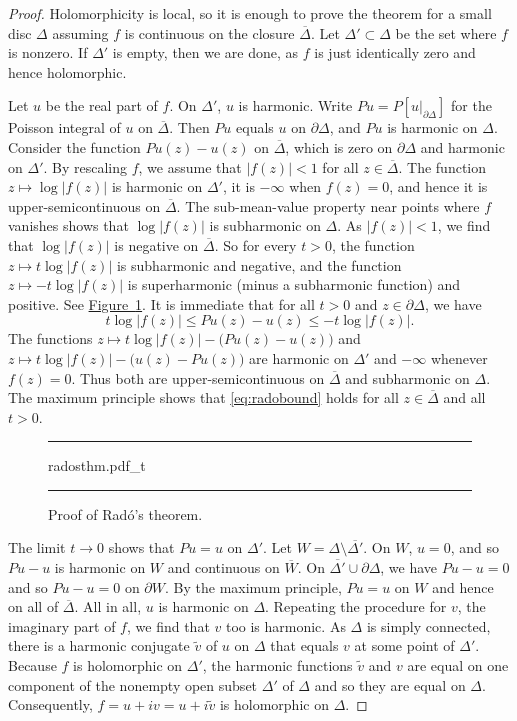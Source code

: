 \documentclass[12pt,openany]{book}
\newcommand{\widebar}[1]{\overline{#1}}
\newcommand{\sabs}[1]{\lvert {#1} \rvert}
\newcommand{\abs}[1]{\left\lvert {#1} \right\rvert}
\theoremstyle{plain}
\theoremstyle{remark}
\theoremstyle{definition}
\newenvironment{myfig}{%
\begin{figure}[h!t]
\noindent\rule{\textwidth}{0.5pt}\vspace{12pt}\par\centering}%
{\par\noindent\rule{\textwidth}{0.5pt}
\end{figure}}
\theoremstyle{exercise}
\theoremstyle{example}
\newcommand{\figureref}[1]{\hyperref[#1]{Figure~\ref*{#1}}}
\begin{document}
\begin{proof}
Holomorphicity is local, so
it is enough to prove the theorem for a small disc $\Delta$
assuming $f$ is continuous
on the closure $\overline{\Delta}$.  Let $\Delta' \subset \Delta$ be the set
where $f$ is nonzero.  If $\Delta'$ is empty, then we are done, as
$f$ is just identically zero and hence holomorphic.

Let $u$ be the real part of $f$.  On $\Delta'$, $u$ is harmonic.
Write $Pu = P[u|_{\partial \Delta}]$ for the Poisson integral of $u$ on
$\overline{\Delta}$.  Then $Pu$
equals $u$ on $\partial \Delta$, and $Pu$ is harmonic on $\Delta$.
Consider the function
$Pu(z) - u(z)$ on $\overline{\Delta}$, which is zero
on $\partial \Delta$ and harmonic on $\Delta'$.  By rescaling $f$,
we assume that $\abs{f(z)} < 1$ for all $z
\in \overline{\Delta}$. 
The function $z \mapsto \log \sabs{f(z)}$ is harmonic on $\Delta'$, it is
$-\infty$ when $f(z) = 0$, and hence it is upper-semicontinuous on
$\overline{\Delta}$.
The sub-mean-value property near points where $f$ vanishes
shows that
$\log \sabs{f(z)}$ is subharmonic on $\Delta$.
As $\sabs{f(z)} < 1$, we find that
$\log \sabs{f(z)}$ is negative on $\overline{\Delta}$.
So for every $t > 0$,
the function
$z \mapsto t \log \abs{f(z)}$ is subharmonic and negative,
and the function
$z \mapsto -t \log \abs{f(z)}$ is superharmonic
(minus a subharmonic function) and positive.
See \figureref{fig:radosthm}.
It is immediate that for all $t > 0$ and
$z \in \partial \Delta$,
we have
\begin{equation} \label{eq:radobound}
t \log \abs{f(z)} \leq Pu(z)-u(z) \leq -t \log \abs{f(z)}  .
\end{equation}
The functions
$z \mapsto t \log \abs{f(z)} - \bigl(Pu(z)-u(z)\bigr)$
and
$z \mapsto t \log \abs{f(z)} - \bigl(u(z)-Pu(z)\bigr)$
are harmonic on $\Delta'$ and $-\infty$ whenever $f(z)=0$.
Thus both are upper-semicontinuous on $\overline{\Delta}$
and subharmonic on $\Delta$.
The maximum principle shows that
\eqref{eq:radobound} holds
for all $z \in \overline{\Delta}$ and all $t > 0$.

\begin{myfig}
{radosthm.pdf_t}
\caption{Proof of Rad\'o's theorem.\label{fig:radosthm}}
\end{myfig}

The limit
$t \to 0$ shows that $Pu = u$ on $\Delta'$.
Let $W = \Delta \setminus \overline{\Delta'}$.
On $W$, $u=0$, and so $Pu-u$ is harmonic on $W$
and continuous on $\widebar{W}$.
On $\overline{\Delta'} \cup \partial \Delta$,
we have $Pu-u=0$
and so $Pu-u=0$ on $\partial W$.  By the maximum principle, $Pu=u$ on $W$
and hence on all of $\overline{\Delta}$.  All in all, $u$ is harmonic on
$\Delta$.
Repeating the procedure for $v$, the imaginary part of $f$, we find
that $v$ too is harmonic.
As $\Delta$ is simply connected,
there is a harmonic conjugate $\tilde{v}$ of $u$ on $\Delta$ that equals $v$ at
some point of $\Delta'$.  Because $f$ is holomorphic on $\Delta'$,
the harmonic functions $\tilde{v}$ and $v$
are equal on one component of the nonempty open subset $\Delta'$ of $\Delta$ and so
they are equal on $\Delta$.  Consequently, $f = u +iv = u+i\tilde{v}$ is holomorphic on
$\Delta$.
\end{proof}
\end{document}
